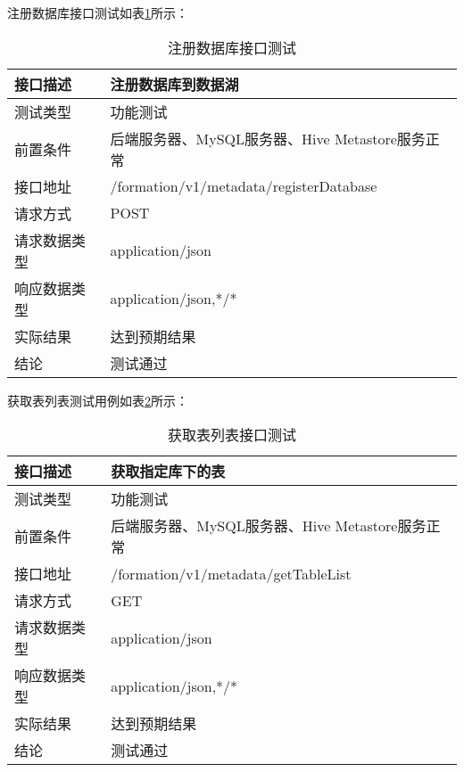 注册数据库接口测试如表\ref{tab:exampletable6}所示：

\begin{table}[H]
  \centering
  \caption{注册数据库接口测试}
  \label{tab:exampletable6}
  \begin{tabular}{ll}
    \toprule
    接口描述         & 注册数据库到数据湖         \\
    \midrule
    测试类型         & 功能测试         \\
    前置条件         & 后端服务器、MySQL服务器、Hive Metastore服务正常         \\
    接口地址       & /formation/v1/metadata/registerDatabase        \\
    请求方式         & POST      \\
    请求数据类型         & application/json     \\
    响应数据类型         & application/json,*/*           \\
    实际结果         & 达到预期结果           \\
    结论            & 测试通过           \\
    \bottomrule
  \end{tabular}
\end{table}

获取表列表测试用例如表\ref{tab:exampletable7}所示：

\begin{table}[H]
  \centering
  \caption{获取表列表接口测试}
  \label{tab:exampletable7}
  \begin{tabular}{ll}
    \toprule
    接口描述         & 获取指定库下的表         \\
    \midrule
    测试类型         & 功能测试         \\
    前置条件         & 后端服务器、MySQL服务器、Hive Metastore服务正常         \\
    接口地址       & /formation/v1/metadata/getTableList        \\
    请求方式         & GET      \\
    请求数据类型         & application/json     \\
    响应数据类型         & application/json,*/*           \\
    实际结果         & 达到预期结果           \\
    结论            & 测试通过           \\
    \bottomrule
  \end{tabular}
\end{table}

